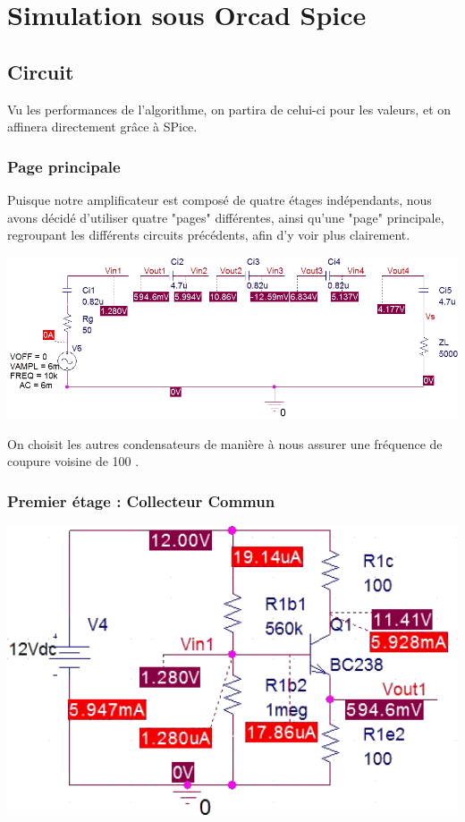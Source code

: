  \chapter{Simulation sous Orcad Spice}
  \section{Circuit}
    Vu les performances de l’algorithme, on partira de celui-ci pour les valeurs, et 
    on affinera directement grâce à SPice.

   \subsection{Page principale}
    Puisque notre amplificateur est composé de quatre étages indépendants, nous avons décidé d'utiliser quatre "pages"
    différentes, ainsi qu'une "page"  principale, regroupant les différents circuits précédents, afin d'y voir plus clairement.

    \includegraphics[width=17cm]{images/g}

    On choisit les autres condensateurs de manière à nous assurer une fréquence de coupure voisine de 100 \hertz.

   \subsection{Premier étage : Collecteur Commun}
    \includegraphics[width=17cm]{images/1}

